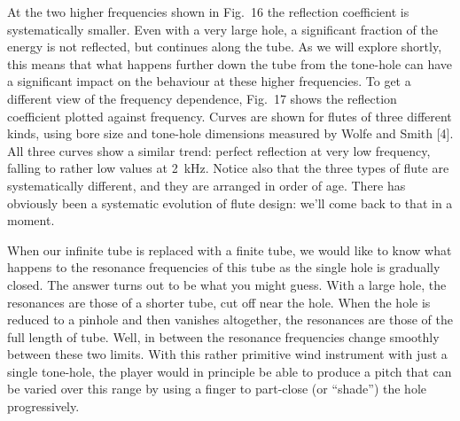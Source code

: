 
  At the two higher frequencies shown in Fig.\ 16 the reflection coefficient is 
  systematically smaller. Even with a very large hole, a significant fraction 
  of the energy is not reflected, but continues along the tube. As we will 
  explore shortly, this means that what happens further down the tube from the 
  tone-hole can have a significant impact on the behaviour at these higher 
  frequencies. To get a different view of the frequency dependence, Fig.\ 17 
  shows the reflection coefficient plotted against frequency. Curves are shown 
  for flutes of three different kinds, using bore size and tone-hole dimensions 
  measured by Wolfe and Smith [4]. All three curves show a similar trend: 
  perfect reflection at very low frequency, falling to rather low values at 
  2~kHz. Notice also that the three types of flute are systematically 
  different, and they are arranged in order of age. There has obviously been a 
  systematic evolution of flute design: we’ll come back to that in a moment. 


  When our infinite tube is replaced with a finite tube, we would like to know 
  what happens to the resonance frequencies of this tube as the single hole is 
  gradually closed. The answer turns out to be what you might guess. With a 
  large hole, the resonances are those of a shorter tube, cut off near the 
  hole. When the hole is reduced to a pinhole and then vanishes altogether, the 
  resonances are those of the full length of tube. Well, in between the 
  resonance frequencies change smoothly between these two limits. With this 
  rather primitive wind instrument with just a single tone-hole, the player 
  would in principle be able to produce a pitch that can be varied over this 
  range by using a finger to part-close (or “shade”) the hole progressively. 

